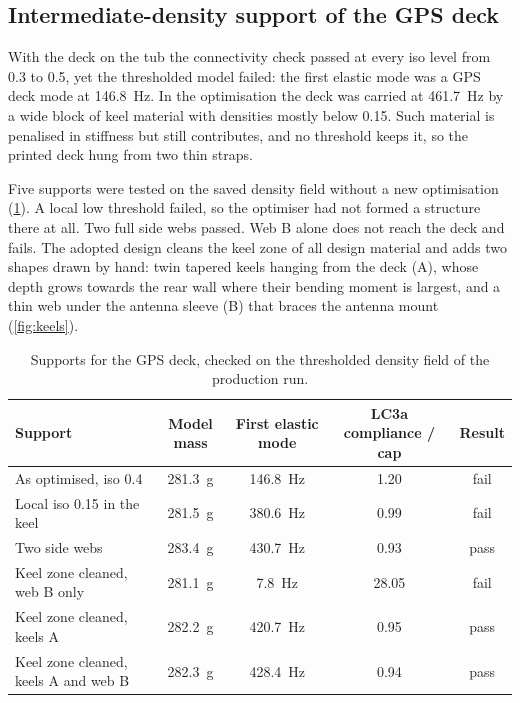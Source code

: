 \subsection{Intermediate-density support of the GPS deck}

With the deck on the tub the connectivity check passed at every iso level from 0.3 to 0.5, yet the thresholded model failed: the first elastic mode was a GPS deck mode at \SI{146.8}{Hz}. In the optimisation the deck was carried at \SI{461.7}{Hz} by a wide block of keel material with densities mostly below 0.15. Such material is penalised in stiffness but still contributes, and no threshold keeps it, so the printed deck hung from two thin straps.

Five supports were tested on the saved density field without a new optimisation (\cref{tab:keels}). A local low threshold failed, so the optimiser had not formed a structure there at all. Two full side webs passed. Web B alone does not reach the deck and fails. The adopted design cleans the keel zone of all design material and adds two shapes drawn by hand: twin tapered keels hanging from the deck (A), whose depth grows towards the rear wall where their bending moment is largest, and a thin web under the antenna sleeve (B) that braces the antenna mount (\cref{fig:keels}).

\begin{table}[htbp]
\centering\small
\caption{Supports for the GPS deck, checked on the thresholded density field of the production run.}\label{tab:keels}
\begin{tabular}{@{}lcccc@{}}
\toprule
Support & Model mass & First elastic mode & LC3a compliance / cap & Result\\
\midrule
As optimised, iso 0.4 & \SI{281.3}{g} & \SI{146.8}{Hz} & 1.20 & fail\\
Local iso 0.15 in the keel & \SI{281.5}{g} & \SI{380.6}{Hz} & 0.99 & fail\\
Two side webs & \SI{283.4}{g} & \SI{430.7}{Hz} & 0.93 & pass\\
Keel zone cleaned, web B only & \SI{281.1}{g} & \SI{7.8}{Hz} & 28.05 & fail\\
Keel zone cleaned, keels A & \SI{282.2}{g} & \SI{420.7}{Hz} & 0.95 & pass\\
Keel zone cleaned, keels A and web B & \SI{282.3}{g} & \SI{428.4}{Hz} & 0.94 & pass\\
\bottomrule
\end{tabular}
\end{table}

